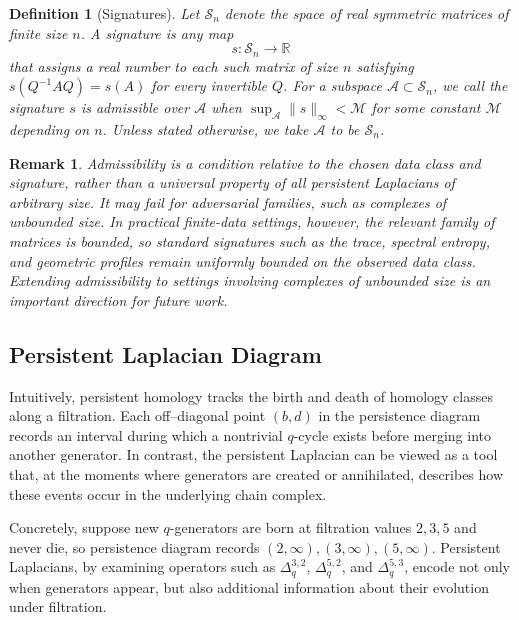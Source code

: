 \documentclass{article}
\newcommand{\R}{\mathbb{R}}
\newtheorem{definition}[theorem]{Definition}
\newtheorem{remark}[theorem]{Remark}
\begin{document}
\begin{definition}[Signatures] \label{def:signatures}
Let $\mathcal{S}_n$ denote the space of real symmetric matrices of finite size $n$.  
A \emph{signature} is any map
\[
s : \mathcal{S}_n \longrightarrow \R
\]
that assigns a real number to each such matrix of size $n$ satisfying $s(Q^{-1} A Q)=s(A)$ for every invertible $Q$. For a subspace $\mathcal A \subset \mathcal S_n$, we call the signature $s$ is \emph{admissible} over $\mathcal A$ when $\sup_{\mathcal A}\|s\|_\infty < \mathcal{M}$ for some constant $\mathcal{M}$ depending on $n$. Unless stated otherwise, we take $\mathcal A$ to be $\mathcal S_n$.
\end{definition}

\begin{remark}
Admissibility is a condition relative to the chosen data class and signature, rather than a universal property of all persistent Laplacians of arbitrary size. It may fail for adversarial families, such as complexes of unbounded size. In practical finite-data settings, however, the relevant family of matrices is bounded, so standard signatures such as the trace, spectral entropy, and geometric profiles remain uniformly bounded on the observed data class. Extending admissibility to settings involving complexes of unbounded size is an important direction for future work.
\end{remark}

\subsection{Persistent Laplacian Diagram}
Intuitively, persistent homology tracks the birth and death of homology classes along a filtration. Each off--diagonal point \((b,d)\) in the persistence diagram records an interval during which a nontrivial \(q\)-cycle exists before merging into another generator. In contrast, the persistent Laplacian can be viewed as a tool that, at the moments where generators are created or annihilated, describes how these events occur in the underlying chain complex. 

Concretely, suppose new \(q\)-generators are born at filtration values \(2,3,5\) and never die, so persistence diagram records \((2,\infty),(3,\infty),(5,\infty)\). Persistent Laplacians, by examining operators such as \(\Delta_q^{3,2}\), \(\Delta_q^{5,2}\), and \(\Delta_q^{5,3}\), encode not only when generators appear, but also additional information about their evolution under filtration.
\end{document}

